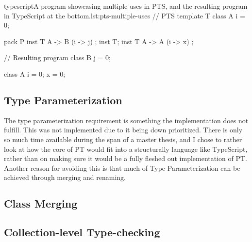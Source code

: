 \begin{code}{typescript}{A program showcasing multiple uses in PTS, and the resulting program in TypeScript at the bottom.}{lst:pts-multiple-uses}
    // PTS
    template T {
        class A {
            i = 0;
        }
    }

    pack P {
        inst T { A -> B (i -> j) };
        inst T;
        inst T { A -> A (i -> x) };
    }

    // Resulting program
    class B {
        j = 0;
    }

    class A {
        i = 0;
        x = 0;
    }
\end{code}

\subsection{Type Parameterization}

The type parameterization requirement is something the implementation does not fulfill.
This was not implemented due to it being down prioritized.
There is only so much time available during the span of a master thesis, and I chose to rather look at how the core of PT would fit into a structurally language like TypeScript, rather than on making sure it would be a fully fleshed out implementation of PT.
Another reason for avoiding this is that much of Type Parameterization can be achieved through merging and renaming.


\subsection{Class Merging}

\subsection{Collection-level Type-checking}\label{subsec:implementation-collection-level-type-checking}


